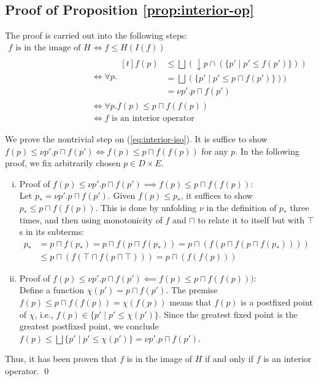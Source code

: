 \documentclass{llncs}
\newcommand{\bigjoin}{\bigsqcup}
\newcommand{\meet}{\sqcap}
\begin{document}
\subsection{Proof of Proposition \ref{prop:interior-op}}
The proof is carried out into the following steps:
\begin{align*}
 f \text{ is in the image of } H &\iff f \leq H(I(f)) \\
                                 &\iff \forall p.
                                   \begin{aligned}[t] f(p)& \leq \bigjoin (\downarrow p \cap (\{p' \mid p' \leq f(p') \})) \\
                                                          &= \bigjoin (\{p' \mid p' \leq  p \meet f(p') \})) \\
                                                          &= \nu p' . p \meet f(p')
                                   \end{aligned} \\
  &\iff \forall p. f(p) \leq p \meet f(f(p))  \tag{*}\label{eq:interior-iso}\\
  &\iff f \text{ is an interior operator}
\end{align*}

We prove the nontrivial step on (\ref{eq:interior-iso}).
It is suffice to show $f(p) \leq \nu p' . p \meet f(p') \iff f(p) \leq p \meet f(f(p))$ for any $p$.
In the following proof, we fix arbitrarily chosen $p \in D \times E$.
\begin{enumerate}[i.]
\item{Proof of $f(p) \leq \nu p' . p \meet f(p') \implies f(p) \leq p \meet f(f(p))$:}\\
Let $p_{*} = \nu p' . p \meet f(p')$. Given $f (p) \leq p_{*}$, it suffices to show $p_{*} \leq p \meet f(f(p))$. This is done by unfolding $\nu$ in the definition of $p_{*}$ three times, and then using monotonicity of $f$ and $\meet$ to relate it to itself but with $\top$s in its subterms:
\begin{align*}
p_{*} & = p \meet f(p_{*}) = p \meet f(p \meet f(p_{*})) = p \meet (f (p \meet f(p \meet f(p_{*})))) \\
      & \leq p \meet (f (\top \meet f(p \meet \top))) = p \meet (f (f (p)))
\end{align*}
\item{Proof of $f(p) \leq \nu p' . p \meet f(p') \impliedby f(p) \leq p \meet f(f(p)))$:}\\
Define a function $\chi(p') = p \meet f(p')$.
The premise $f(p) \leq p \meet f (f (p)) = \chi (f(p))$ means that $f(p)$ is a postfixed point of $\chi$, i.e., $f(p) \in \{ p' \mid p' \leq \chi(p') \}$. Since the greatest fixed point is the greatest postfixed point, we conclude $f(p) \leq \bigjoin \{ p' \mid p' \leq \chi(p') \} = \nu p' . p \meet f(p') $.
\end{enumerate}
Thus, it has been proven that $f$ is in the image of $H$ if and only if $f$ is an interior operator.
\qed
\end{document}

